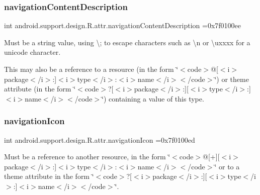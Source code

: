 \subsubsection{\texorpdfstring{navigation\+Content\+Description}{navigationContentDescription}}
{\footnotesize\ttfamily int android.\+support.\+design.\+R.\+attr.\+navigation\+Content\+Description =0x7f0100ee\hspace{0.3cm}{\ttfamily [static]}}

Must be a string value, using \textquotesingle{}\textbackslash{};\textquotesingle{} to escape characters such as \textquotesingle{}\textbackslash{}n\textquotesingle{} or \textquotesingle{}\textbackslash{}uxxxx\textquotesingle{} for a unicode character. 

This may also be a reference to a resource (in the form \char`\"{}$<$code$>$@\mbox{[}$<$i$>$package$<$/i$>$\+:\mbox{]}$<$i$>$type$<$/i$>$\+:$<$i$>$name$<$/i$>$$<$/code$>$\char`\"{}) or theme attribute (in the form \char`\"{}$<$code$>$?\mbox{[}$<$i$>$package$<$/i$>$\+:\mbox{]}\mbox{[}$<$i$>$type$<$/i$>$\+:\mbox{]}$<$i$>$name$<$/i$>$$<$/code$>$\char`\"{}) containing a value of this type. \mbox{\label{classandroid_1_1support_1_1design_1_1R_1_1attr_a9ae2a9f1ec65d153e45bcda69eadbcf2}} 
\subsubsection{\texorpdfstring{navigation\+Icon}{navigationIcon}}
{\footnotesize\ttfamily int android.\+support.\+design.\+R.\+attr.\+navigation\+Icon =0x7f0100ed\hspace{0.3cm}{\ttfamily [static]}}

Must be a reference to another resource, in the form \char`\"{}$<$code$>$@\mbox{[}+\mbox{]}\mbox{[}$<$i$>$package$<$/i$>$\+:\mbox{]}$<$i$>$type$<$/i$>$\+:$<$i$>$name$<$/i$>$$<$/code$>$\char`\"{} or to a theme attribute in the form \char`\"{}$<$code$>$?\mbox{[}$<$i$>$package$<$/i$>$\+:\mbox{]}\mbox{[}$<$i$>$type$<$/i$>$\+:\mbox{]}$<$i$>$name$<$/i$>$$<$/code$>$\char`\"{}. \mbox{\label{classandroid_1_1support_1_1design_1_1R_1_1attr_a109c739e0d040aef57bdb0c1dadb4e48}} 
